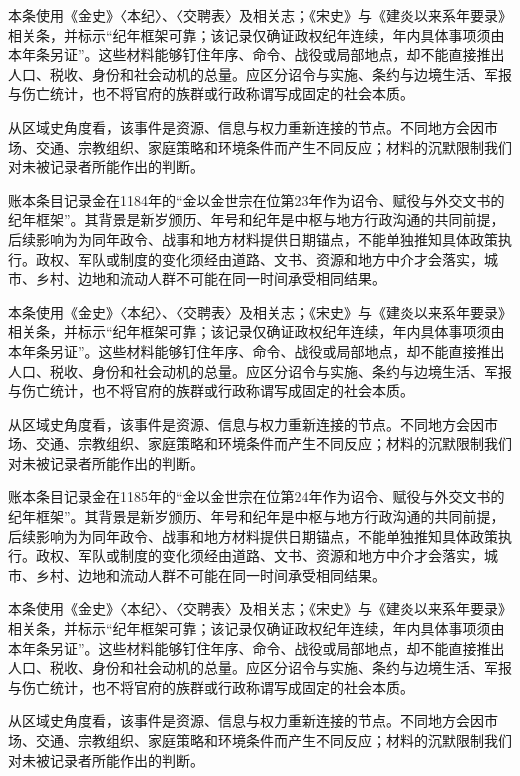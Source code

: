 本条使用《金史》〈本纪〉、〈交聘表〉及相关志；《宋史》与《建炎以来系年要录》相关条，并标示“纪年框架可靠；该记录仅确证政权纪年连续，年内具体事项须由本年条另证”。这些材料能够钉住年序、命令、战役或局部地点，却不能直接推出人口、税收、身份和社会动机的总量。应区分诏令与实施、条约与边境生活、军报与伤亡统计，也不将官府的族群或行政称谓写成固定的社会本质。

从区域史角度看，该事件是资源、信息与权力重新连接的节点。不同地方会因市场、交通、宗教组织、家庭策略和环境条件而产生不同反应；材料的沉默限制我们对未被记录者所能作出的判断。

账本条目记录金在1184年的“金以金世宗在位第23年作为诏令、赋役与外交文书的纪年框架”。其背景是新岁颁历、年号和纪年是中枢与地方行政沟通的共同前提，后续影响为为同年政令、战事和地方材料提供日期锚点，不能单独推知具体政策执行。政权、军队或制度的变化须经由道路、文书、资源和地方中介才会落实，城市、乡村、边地和流动人群不可能在同一时间承受相同结果。

本条使用《金史》〈本纪〉、〈交聘表〉及相关志；《宋史》与《建炎以来系年要录》相关条，并标示“纪年框架可靠；该记录仅确证政权纪年连续，年内具体事项须由本年条另证”。这些材料能够钉住年序、命令、战役或局部地点，却不能直接推出人口、税收、身份和社会动机的总量。应区分诏令与实施、条约与边境生活、军报与伤亡统计，也不将官府的族群或行政称谓写成固定的社会本质。

从区域史角度看，该事件是资源、信息与权力重新连接的节点。不同地方会因市场、交通、宗教组织、家庭策略和环境条件而产生不同反应；材料的沉默限制我们对未被记录者所能作出的判断。

账本条目记录金在1185年的“金以金世宗在位第24年作为诏令、赋役与外交文书的纪年框架”。其背景是新岁颁历、年号和纪年是中枢与地方行政沟通的共同前提，后续影响为为同年政令、战事和地方材料提供日期锚点，不能单独推知具体政策执行。政权、军队或制度的变化须经由道路、文书、资源和地方中介才会落实，城市、乡村、边地和流动人群不可能在同一时间承受相同结果。

本条使用《金史》〈本纪〉、〈交聘表〉及相关志；《宋史》与《建炎以来系年要录》相关条，并标示“纪年框架可靠；该记录仅确证政权纪年连续，年内具体事项须由本年条另证”。这些材料能够钉住年序、命令、战役或局部地点，却不能直接推出人口、税收、身份和社会动机的总量。应区分诏令与实施、条约与边境生活、军报与伤亡统计，也不将官府的族群或行政称谓写成固定的社会本质。

从区域史角度看，该事件是资源、信息与权力重新连接的节点。不同地方会因市场、交通、宗教组织、家庭策略和环境条件而产生不同反应；材料的沉默限制我们对未被记录者所能作出的判断。

